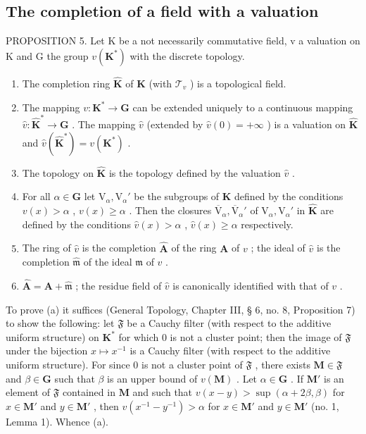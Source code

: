 \subsection{The completion of a field with a valuation}

PROPOSITION 5. Let K be a not necessarily commutative field, v a valuation on K and G the group \(v(\mathbf{K}^{*})\) with the discrete topology.

\begin{enumerate}
\def\labelenumi{(\alph{enumi})}
\item
  The completion ring \(\hat{\mathbf{K}}\) of \(\mathbf{K}\) (with \(\mathcal{T}_v\) ) is a topological field.
\item
  The mapping \(v: \mathbf{K}^* \to \mathbf{G}\) can be extended uniquely to a continuous mapping \(\hat{v}: \hat{\mathbf{K}}^* \to \mathbf{G}\) . The mapping \(\hat{v}\) (extended by \(\hat{v}(0) = +\infty\) ) is a valuation on \(\hat{\mathbf{K}}\) and \(\hat{v}(\hat{\mathbf{K}}^*) = v(\mathbf{K}^*)\) .
\item
  The topology on \(\hat{\mathbf{K}}\) is the topology defined by the valuation \(\hat{v}\) .
\item
  For all \(\alpha \in \mathbf{G}\) let \(\mathrm{V}_{\alpha}, \mathrm{V}_{\alpha}'\) be the subgroups of \(\mathbf{K}\) defined by the conditions \(v(x) > \alpha\) , \(v(x) \geqslant \alpha\) . Then the closures \(\overline{\mathrm{V}}_{\alpha}, \overline{\mathrm{V}}_{\alpha}'\) of \(\mathrm{V}_{\alpha}, \mathrm{V}_{\alpha}'\) in \(\hat{\mathbf{K}}\) are defined by the conditions \(\hat{v}(x) > \alpha\) , \(\hat{v}(x) \geqslant \alpha\) respectively.
\item
  The ring of \(\hat{v}\) is the completion \(\hat{\mathbf{A}}\) of the ring \(\mathbf{A}\) of \(v\) ; the ideal of \(\hat{v}\) is the completion \(\hat{\mathfrak{m}}\) of the ideal \(\mathfrak{m}\) of \(v\) .
\item
  \(\hat{\mathbf{A}} = \mathbf{A} + \hat{\mathfrak{m}}\) ; the residue field of \(\hat{v}\) is canonically identified with that of \(v\) .
\end{enumerate}

To prove (a) it suffices (General Topology, Chapter III, § 6, no. 8, Proposition 7) to show the following: let \(\mathfrak{F}\) be a Cauchy filter (with respect to the additive uniform structure) on \(\mathbf{K}^*\) for which 0 is not a cluster point; then the image of \(\mathfrak{F}\) under the bijection \(x \mapsto x^{-1}\) is a Cauchy filter (with respect to the additive uniform structure). For since 0 is not a cluster point of \(\mathfrak{F}\) , there exists \(\mathbf{M} \in \mathfrak{F}\) and \(\beta \in \mathbf{G}\) such that \(\beta\) is an upper bound of \(v(\mathbf{M})\) . Let \(\alpha \in \mathbf{G}\) . If \(\mathbf{M}'\) is an element of \(\mathfrak{F}\) contained in \(\mathbf{M}\) and such that \(v(x - y) > \sup (\alpha + 2\beta, \beta)\) for \(x \in \mathbf{M}'\) and \(y \in \mathbf{M}'\) , then \(v(x^{-1} - y^{-1}) > \alpha\) for \(x \in \mathbf{M}'\) and \(y \in \mathbf{M}'\) (no. 1, Lemma 1). Whence (a).

